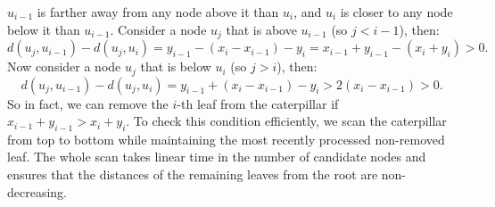 \documentclass[a4paper,UKenglish]{lipics-v2016}
\theoremstyle{plain}
\begin{document}
\begin{enumerate}
$u_{i-1}$ is farther away from any node above it than $u_i$, and $u_i$ is closer to any node below it than $u_{i-1}$.
Consider a node $u_{j}$ that is above $u_{i-1}$ (so $j<i-1$), then:
$$d(u_j,u_{i-1}) - d(u_j,u_{i}) = y_{i-1}-(x_i-x_{i-1})-y_i = x_{i-1}+y_{i-1}-(x_i+y_i) > 0.$$
Now consider a node $u_{j}$ that is below $u_{i}$ (so $j>i$), then:
$$d(u_j,u_{i-1}) - d(u_j,u_{i}) = y_{i-1}+(x_i-x_{i-1})-y_i > 2(x_i-x_{i-1}) > 0.$$
So in fact, we can remove the $i$-th leaf from the caterpillar if $x_{i-1}+y_{i-1} > x_i+y_i$.
To check this condition efficiently, we scan the caterpillar from top to bottom while maintaining the most recently processed non-removed leaf.
The whole scan takes linear time in the number of candidate nodes and ensures that the distances of the
remaining leaves from the root are non-decreasing.


\end{enumerate}
\end{document}
